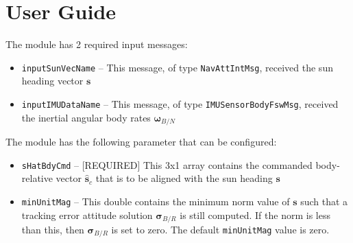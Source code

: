 
\section{User Guide}
The module has 2 required input messages:
\begin{itemize}
	\item {\tt inputSunVecName} -- This message, of type {\tt NavAttIntMsg}, received the sun heading vector $\bm s$
	\item {\tt inputIMUDataName} -- This message, of type {\tt IMUSensorBodyFswMsg}, received the inertial angular body rates $\bm \omega_{B/N}$
\end{itemize}

The module has the following parameter that can be configured:
\begin{itemize}
	\item {\tt sHatBdyCmd} -- [REQUIRED] This 3x1 array contains the commanded body-relative vector $\hat{\bm s}_{c}$ that is to be aligned with the sun heading $\bm s$
	\item {\tt minUnitMag} -- This double contains the minimum norm value of $\bm s$ such that a tracking error attitude solution $\bm\sigma_{B/R}$ is still computed.  If the norm is less than this, then $\bm\sigma_{B/R}$ is set to zero.    The default {\tt minUnitMag} value is zero. 
\end{itemize}


